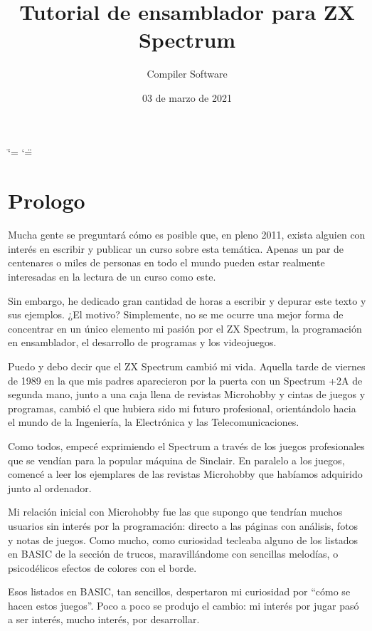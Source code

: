 \documentclass[letterpaper,10pt,spanish]{sphinxmanual}
\title{Tutorial de ensamblador para ZX Spectrum}
\date{03 de marzo de 2021}
\author{Compiler Software}
\begin{document}
\ifdefined\shorthandoff
  \ifnum\catcode`\=\string=\active\shorthandoff{=}\fi
  \ifnum\catcode`\"=\active{}\fi
\fi

\pagestyle{empty}
\sphinxmaketitle
\pagestyle{plain}
\sphinxtableofcontents
\pagestyle{normal}
\label{\detokenize{index::doc}}



\chapter{Prologo}
\label{\detokenize{01_prologo/prologo:prologo}}\label{\detokenize{01_prologo/prologo::doc}}
Mucha gente se preguntará cómo es posible que, en pleno 2011, exista alguien con interés en escribir y publicar un curso sobre esta temática. Apenas un par de centenares o miles de personas en todo el mundo pueden estar realmente interesadas en la lectura de un curso como este.

Sin embargo, he dedicado gran cantidad de horas a escribir y depurar este texto y sus ejemplos. ¿El motivo? Simplemente, no se me ocurre una mejor forma de concentrar en un único elemento mi pasión por el ZX Spectrum, la programación en ensamblador, el desarrollo de programas y los videojuegos.

Puedo y debo decir que el ZX Spectrum cambió mi vida. Aquella tarde de viernes de 1989 en la que mis padres aparecieron por la puerta con un Spectrum +2A de segunda mano, junto a una caja llena de revistas Microhobby y cintas de juegos y programas, cambió el que hubiera sido mi futuro profesional, orientándolo hacia el mundo de la Ingeniería, la Electrónica y las Telecomunicaciones.

Como todos, empecé exprimiendo el Spectrum a través de los juegos profesionales que se vendían para la popular máquina de Sinclair. En paralelo a los juegos, comencé a leer los ejemplares de las revistas Microhobby que habíamos adquirido junto al ordenador.

Mi relación inicial con Microhobby fue las que supongo que tendrían muchos usuarios sin interés por la programación: directo a las páginas con análisis, fotos y notas de juegos. Como mucho, como curiosidad tecleaba alguno de los listados en BASIC de la sección de trucos, maravillándome con sencillas melodías, o psicodélicos efectos de colores con el borde.

Esos listados en BASIC, tan sencillos, despertaron mi curiosidad por “cómo se hacen estos juegos”. Poco a poco se produjo el cambio: mi interés por jugar pasó a ser interés, mucho interés, por desarrollar.
\end{document}
